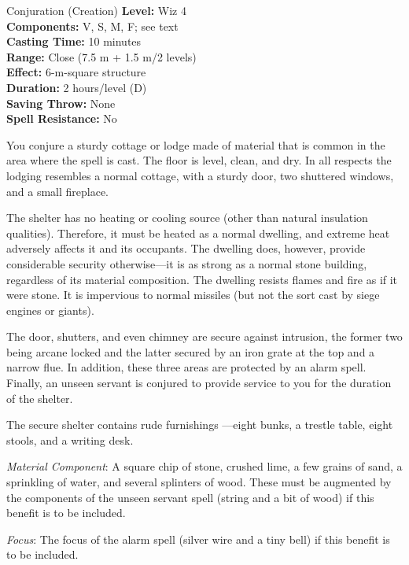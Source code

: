{Conjuration (Creation)}
{
	\textbf{Level:}
	Wiz 4\\
	\textbf{Components:}
	V, S, M, F; see text\\
	\textbf{Casting Time:}
	10 minutes\\
	\textbf{Range:}
	Close (7.5 m + 1.5 m/2 levels)\\
	\textbf{Effect:}
	6-m-square structure\\
	\textbf{Duration:}
	2 hours/level (D)\\
	\textbf{Saving Throw:}
	None\\
	\textbf{Spell Resistance:}
	No\\
}
{
	You conjure a sturdy cottage or lodge made of material that is common in the area where the spell is cast. The floor is level, clean, and dry. In all respects the lodging resembles a normal cottage, with a sturdy door, two shuttered windows, and a small fireplace.

	The shelter has no heating or cooling source (other than natural insulation qualities). Therefore, it must be heated as a normal dwelling, and extreme heat adversely affects it and its occupants. The dwelling does, however, provide considerable security otherwise---it is as strong as a normal stone building, regardless of its material composition. The dwelling resists flames and fire as if it were stone. It is impervious to normal missiles (but not the sort cast by siege engines or giants).

	The door, shutters, and even chimney are secure against intrusion, the former two being arcane locked and the latter secured by an iron grate at the top and a narrow flue. In addition, these three areas are protected by an alarm spell. Finally, an unseen servant is conjured to provide service to you for the duration of the shelter.

	The secure shelter contains rude furnishings ---eight bunks, a trestle table, eight stools, and a writing desk.

	\textit{Material Component}:
	A square chip of stone, crushed lime, a few grains of sand, a sprinkling of water, and several splinters of wood. These must be augmented by the components of the unseen servant spell (string and a bit of wood) if this benefit is to be included.

	\textit{Focus}:
	The focus of the alarm spell (silver wire and a tiny bell) if this benefit is to be included.

}
